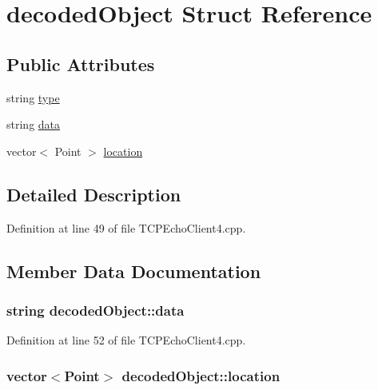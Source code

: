 \hypertarget{structdecodedObject}{}\section{decoded\+Object Struct Reference}
\label{structdecodedObject}
\subsection*{Public Attributes}
\begin{DoxyCompactItemize}
\item 
string \hyperlink{structdecodedObject_a40e0bde9067ac014de208031bd551139}{type}
\item 
string \hyperlink{structdecodedObject_ae43d217f4ebf3e8463f44535317c79e6}{data}
\item 
vector$<$ Point $>$ \hyperlink{structdecodedObject_a8af27338f3a6956fa89860c5f8eff23e}{location}
\end{DoxyCompactItemize}


\subsection{Detailed Description}


Definition at line 49 of file T\+C\+P\+Echo\+Client4.\+cpp.



\subsection{Member Data Documentation}
\subsubsection[{\texorpdfstring{data}{data}}]{\setlength{\rightskip}{0pt plus 5cm}string decoded\+Object\+::data}\hypertarget{structdecodedObject_ae43d217f4ebf3e8463f44535317c79e6}{}\label{structdecodedObject_ae43d217f4ebf3e8463f44535317c79e6}


Definition at line 52 of file T\+C\+P\+Echo\+Client4.\+cpp.

\subsubsection[{\texorpdfstring{location}{location}}]{\setlength{\rightskip}{0pt plus 5cm}vector$<$Point$>$ decoded\+Object\+::location}\hypertarget{structdecodedObject_a8af27338f3a6956fa89860c5f8eff23e}{}\label{structdecodedObject_a8af27338f3a6956fa89860c5f8eff23e}


